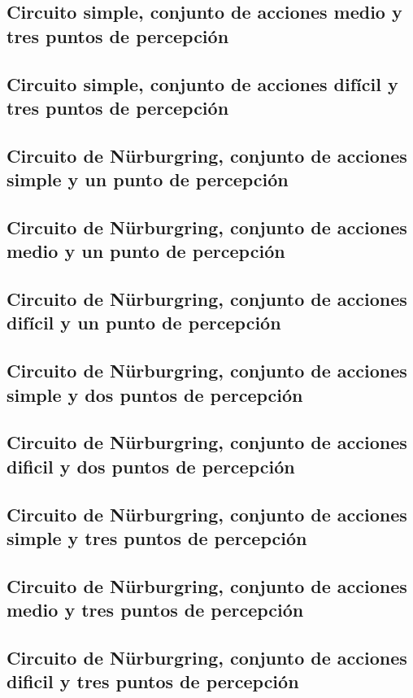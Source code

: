 \subsection{Circuito simple, conjunto de acciones medio y tres puntos de percepción}

\subsection{Circuito simple, conjunto de acciones difícil y tres puntos de percepción}

\subsection{Circuito de Nürburgring, conjunto de acciones simple y un punto de percepción}

\subsection{Circuito de Nürburgring, conjunto de acciones medio y un punto de percepción}

\subsection{Circuito de Nürburgring, conjunto de acciones difícil y un punto de percepción}

\subsection{Circuito de Nürburgring, conjunto de acciones simple y dos puntos de percepción}

\subsection{Circuito de Nürburgring, conjunto de acciones dificil y dos puntos de percepción}

\subsection{Circuito de Nürburgring, conjunto de acciones simple y tres puntos de percepción}

\subsection{Circuito de Nürburgring, conjunto de acciones medio y tres puntos de percepción}

\subsection{Circuito de Nürburgring, conjunto de acciones dificil y tres puntos de percepción}